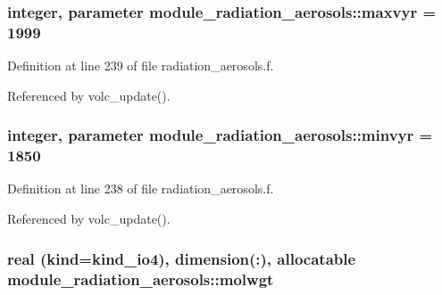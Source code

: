 \subsubsection[{\texorpdfstring{maxvyr}{maxvyr}}]{\setlength{\rightskip}{0pt plus 5cm}integer, parameter module\+\_\+radiation\+\_\+aerosols\+::maxvyr = 1999\hspace{0.3cm}{\ttfamily [private]}}\hypertarget{namespacemodule__radiation__aerosols_ad856a3d564ff84043219626759673f27}{}\label{namespacemodule__radiation__aerosols_ad856a3d564ff84043219626759673f27}


Definition at line 239 of file radiation\+\_\+aerosols.\+f.



Referenced by volc\+\_\+update().

\subsubsection[{\texorpdfstring{minvyr}{minvyr}}]{\setlength{\rightskip}{0pt plus 5cm}integer, parameter module\+\_\+radiation\+\_\+aerosols\+::minvyr = 1850\hspace{0.3cm}{\ttfamily [private]}}\hypertarget{namespacemodule__radiation__aerosols_ab37644d8cc2c222af700b86db91f05e7}{}\label{namespacemodule__radiation__aerosols_ab37644d8cc2c222af700b86db91f05e7}


Definition at line 238 of file radiation\+\_\+aerosols.\+f.



Referenced by volc\+\_\+update().

\subsubsection[{\texorpdfstring{molwgt}{molwgt}}]{\setlength{\rightskip}{0pt plus 5cm}real (kind=kind\+\_\+io4), dimension(\+:), allocatable module\+\_\+radiation\+\_\+aerosols\+::molwgt\hspace{0.3cm}{\ttfamily [private]}}\hypertarget{namespacemodule__radiation__aerosols_a166e63abaa518ec795f8eea6d115f03c}{}\label{namespacemodule__radiation__aerosols_a166e63abaa518ec795f8eea6d115f03c}


